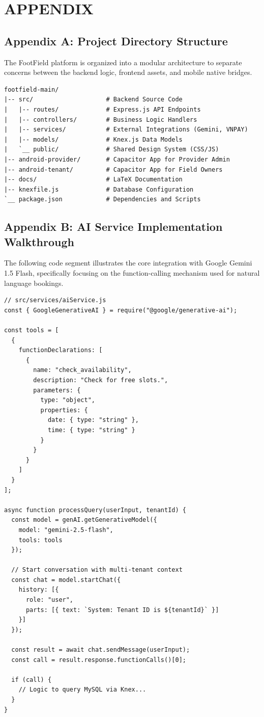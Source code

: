 \section*{APPENDIX}

\subsection*{Appendix A: Project Directory Structure} 
The FootField platform is organized into a modular architecture to separate concerns between the backend logic, frontend assets, and mobile native bridges. 

\begin{verbatim} 
footfield-main/ 
|-- src/                    # Backend Source Code 
|   |-- routes/             # Express.js API Endpoints 
|   |-- controllers/        # Business Logic Handlers 
|   |-- services/           # External Integrations (Gemini, VNPAY) 
|   |-- models/             # Knex.js Data Models 
|   `__ public/             # Shared Design System (CSS/JS) 
|-- android-provider/       # Capacitor App for Provider Admin 
|-- android-tenant/         # Capacitor App for Field Owners 
|-- docs/                   # LaTeX Documentation 
|-- knexfile.js             # Database Configuration 
`__ package.json            # Dependencies and Scripts 
\end{verbatim} 

\subsection*{Appendix B: AI Service Implementation Walkthrough} 
The following code segment illustrates the core integration with Google Gemini 1.5 Flash, specifically focusing on the function-calling mechanism used for natural language bookings. 

\begin{verbatim} 
// src/services/aiService.js 
const { GoogleGenerativeAI } = require("@google/generative-ai"); 

const tools = [ 
  { 
    functionDeclarations: [ 
      { 
        name: "check_availability", 
        description: "Check for free slots.", 
        parameters: { 
          type: "object", 
          properties: { 
            date: { type: "string" }, 
            time: { type: "string" } 
          } 
        } 
      } 
    ] 
  } 
]; 

async function processQuery(userInput, tenantId) { 
  const model = genAI.getGenerativeModel({ 
    model: "gemini-2.5-flash", 
    tools: tools 
  }); 
  
  // Start conversation with multi-tenant context 
  const chat = model.startChat({ 
    history: [{ 
      role: "user", 
      parts: [{ text: `System: Tenant ID is ${tenantId}` }] 
    }] 
  }); 

  const result = await chat.sendMessage(userInput); 
  const call = result.response.functionCalls()[0]; 
  
  if (call) { 
    // Logic to query MySQL via Knex... 
  } 
} 
\end{verbatim} 


